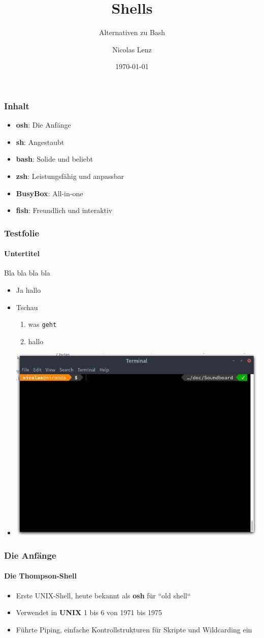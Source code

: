 \documentclass[12pt,utf8]{beamer}
\title{Shells}
\subtitle{Alternativen zu Bash}
\author[N. Lenz]{Nicolas Lenz}
\institute[FOSS AG]{Free and Open Source Software AG\\Fakultät für Informatik}
\date{\today}
\begin{document}
	\titlepage
	\begin{frame}
		\frametitle{Inhalt}
		\begin{itemize}
			\item \textbf{osh}: Die Anfänge
			\item \textbf{sh}: Angestaubt
			\item \textbf{bash}: Solide und beliebt
			\item \textbf{zsh}: Leistungsfähig und anpassbar
			\item \textbf{BusyBox}: All-in-one
			\item \textbf{fish}: Freundlich und interaktiv
		\end{itemize}
	\end{frame}

	\begin{frame}
		\frametitle{Testfolie}
		\framesubtitle{Untertitel}
		Bla bla bla bla
		\begin{itemize}
			\item[\twonotes] Ja hallo
			\item[\twonotes] Tschau
			\begin{enumerate}
				\item was \texttt{geht}
				\item hallo
			\end{enumerate}
			\item\includegraphics[scale=0.2]{res/test.jpg}
		\end{itemize}
	\end{frame}

	\begin{frame}
		\frametitle{Die Anfänge}
		\framesubtitle{Die Thompson-Shell}
		\begin{itemize}
			\item Erste UNIX-Shell, heute bekannt als \textbf{osh} für ``old shell``
			\item Verwendet in \textbf{UNIX} 1 bis 6 von 1971 bis 1975
			\item Führte Piping, einfache Kontrollstrukturen für Skripte und Wildcarding ein
		\end{itemize}
	\end{frame}
\end{document}

